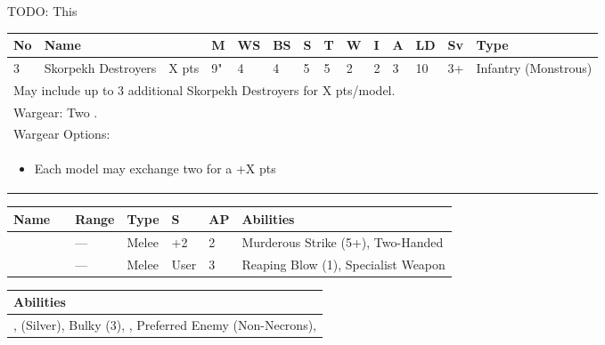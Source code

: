 \newpage
{}

TODO: This

\newpage
{}

\noindent
\begin{tabular}{||m{10pt} m{95pt} m{30pt} m{11pt} m{11pt} m{11pt} m{11pt} m{11pt} m{11pt} m{11pt} m{11pt} m{11pt} m{11pt} m{125pt}||}
	\hline
	No & Name & & M & WS & BS & S & T & W & I & A & LD & Sv & Type \\
	\hline
	3 & Skorpekh Destroyers & X pts & 9" & 4 & 4 & 5 & 5 & 2 & 2 & 3 & 10 & 3+ & Infantry (Monstrous) \\
	\hline
	\hline
	\multicolumn{14}{||Z{532 pt}||}{May include up to 3 additional Skorpekh Destroyers for X pts/model.}\\	
	\hline
	\hline
	\multicolumn{14}{||Z{532 pt}||}{Wargear: Two \quickref{Hyperphase Thresher}.} \\
	\multicolumn{14}{||Z{532 pt}||}{Wargear Options:} \\	\multicolumn{14}{||Z{532 pt}||}{\begin{itemize}
			\item Each model may exchange two \quickref{Hyperphase Thresher} for a \quickref{Hyperphase Reap-Blade} \hrulefill +X pts
	\end{itemize}} \\
	\hline
\end{tabular}

\noindent
\begin{tabular}{||m{110pt} m{30pt} m{31pt} m{55pt} m{12pt} m{12pt} m{210pt}||}
	\hline
	Name & & Range & Type & S & AP & Abilities \\
	\hline
	\quickref{Hyperphase Reap-Blade} &  & — & Melee & +2 & 2 & Murderous Strike (5+), Two-Handed \\
	\quickref{Hyperphase Thresher} &  & — & Melee & User & 3 & Reaping Blow (1), Specialist Weapon \\
	\hline
\end{tabular}

\noindent
\begin{tabular}{||m{532pt}||}
	\hline
	Abilities \\
	\hline
	\quickref{Annihilation Protocols}, \quickref{Awakening Protocols} (Silver), Bulky (3), \quickref{Living Metal}, Preferred Enemy (Non-Necrons), \quickref{Reanimation Protocols} \\
	\hline
\end{tabular}



